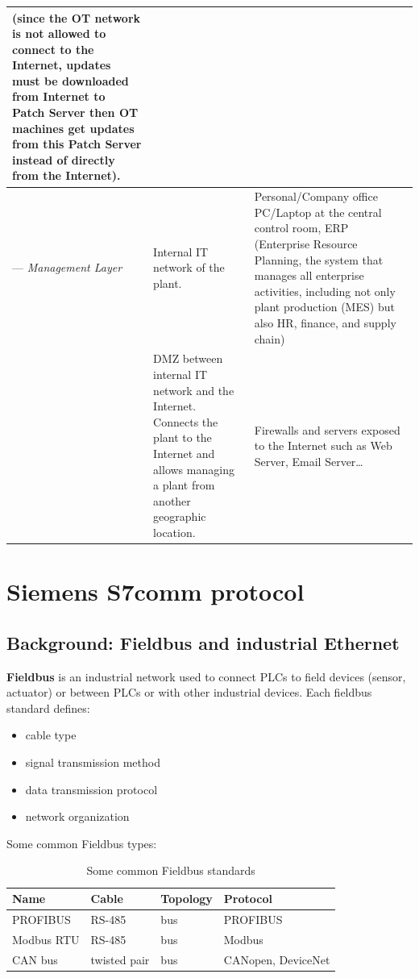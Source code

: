 \documentclass[../main.tex]{subfiles}
\begin{document}
\begin{table}[htbp]
\begin{tabular}{|>{\raggedright\arraybackslash}p{2.1cm}|>{\raggedright\arraybackslash}p{4.3cm}|>{\raggedright\arraybackslash}p{7.2cm}|}
        (since the OT network is not allowed to connect to the Internet, updates must be downloaded from Internet to Patch Server then OT machines get updates from this Patch Server instead of directly from the Internet). \\
        \hline
        4 --- \textit{Management Layer} &
        Internal IT network of the plant. &
        Personal/Company office PC/Laptop at the central control room, ERP (Enterprise Resource Planning, the system that manages all enterprise activities, including not only plant production (MES) but also HR, finance, and supply chain) \\
        \hline
        5 &
        DMZ between internal IT network and the Internet. Connects the plant to the Internet and allows managing a plant from another geographic location. &
        Firewalls and servers exposed to the Internet such as Web Server, Email Server\ldots \\
        \hline
    \end{tabular}
\end{table}

\section{Siemens S7comm protocol}
\label{sec:s7comm}

\subsection{Background: Fieldbus and industrial Ethernet}

\textbf{Fieldbus} is an industrial network used to connect PLCs to field devices (sensor, actuator) or between PLCs or with other industrial devices. Each fieldbus standard defines:

\begin{itemize}
    \item cable type
    \item signal transmission method
    \item data transmission protocol
    \item network organization
\end{itemize}

Some common Fieldbus types:


\begin{table}[H]
    \centering
    \caption{Some common Fieldbus standards}
    \label{tab:fieldbus}
    \footnotesize
    \begin{tabular}{|l|l|l|l|}
        \hline
        \textbf{Name} & \textbf{Cable} & \textbf{Topology} & \textbf{Protocol} \\
        \hline
        PROFIBUS & RS-485 & bus & PROFIBUS \\
        \hline
        Modbus RTU & RS-485 & bus & Modbus \\
        \hline
        CAN bus & twisted pair & bus & CANopen, DeviceNet \\
        \hline
    \end{tabular}
\end{table}
\end{document}
